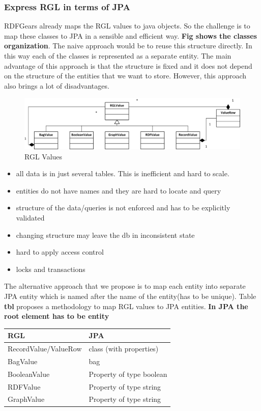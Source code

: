\documentclass[a4paper, notitlepage]{article}
\begin{document}
\subsubsection{Express RGL in terms of JPA}
RDFGears already maps the RGL values to java objects. So the challenge is to map these classes to JPA in a sensible and efficient way. \textbf{Fig shows the classes organization}. The naive approach would be to reuse this structure directly. In this way each of the classes is represented as a separate entity. The main advantage of this approach is that the structure is fixed and it does not depend on the structure of the entities that we want to store. However, this approach also brings a lot of disadvantages. 

\begin{figure}[h!]
  \centering
  	\includegraphics[scale=0.8]{diagrams/RGLValues.png}
  \caption{RGL Values }
  \label{fig_rglValues}
\end{figure}

\begin{itemize}
	\item all data is in just several tables. This is inefficient and hard to scale.
	\item entities do not have names and they are hard to locate and query
	\item structure of the data/queries is not enforced and has to be explicitly validated
	\item changing structure may leave the db in inconsistent state
	\item hard to apply access control
	\item locks and transactions
\end{itemize}

The alternative approach that we propose is to map each entity into separate JPA entity which is named after the name of the entity(has to be unique). Table \textbf{tbl} proposes a methodology to map RGL values to JPA entities. \textbf{In JPA the root element has to be entity}

\begin{center}
    \begin{tabular}{ | l | l |}
    \hline
    RGL & JPA  \\ \hline
    RecordValue/ValueRow & class (with properties)  \\ \hline
    BagValue & bag  \\ \hline
    BooleanValue & Property of type boolean  \\ \hline
    RDFValue & Property of type string  \\ \hline
	GraphValue & Property of type string  \\ \hline
    \end{tabular}
\end{center}
\end{document}
